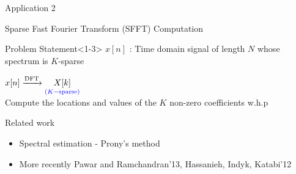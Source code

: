 
\begin{frame}{Application 2}
\end{frame}
	\begin{frame}{Sparse Fast Fourier Transform (SFFT) Computation}
	
	 \begin{block}{Problem Statement}<1-3>
	 	\vspace{4pt}
	 	{\centering \alert{$x[n]$} : Time domain signal of length $N$ whose spectrum is $K$-sparse \\}
	\vspace{10pt} 	
	 	\centering	
	 	
	 {\large	$x[n]  \xrightarrow{\text{DFT}}  \underset{\color{blue}(K-\text{sparse})}{X[k]}$ \\}
	 	\vspace{10pt}
	 	Compute the {\alert{locations}} and \alert{values} of the $K$ non-zero coefficients w.h.p
	 \end{block}
	
	
	
	 {\begin{block}{Related work}
		\begin{itemize}
			\item Spectral estimation - Prony's method
			\item More recently Pawar and Ramchandran'13, Hassanieh, Indyk, Katabi'12
		\end{itemize}
	\end{block}}
	
	
	\end{frame}
